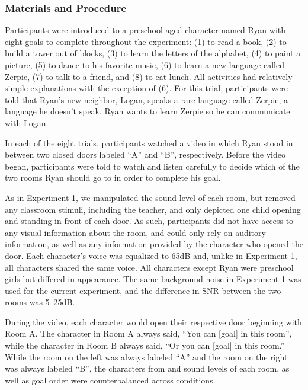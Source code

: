 \documentclass[10pt, letterpaper]{article}
\begin{document}
\hypertarget{materials-and-procedure-2}{%
\subsubsection{Materials and
Procedure}\label{materials-and-procedure-2}}

Participants were introduced to a preschool-aged character named Ryan
with eight goals to complete throughout the experiment: (1) to read a
book, (2) to build a tower out of blocks, (3) to learn the letters of
the alphabet, (4) to paint a picture, (5) to dance to his favorite
music, (6) to learn a new language called Zerpie, (7) to talk to a
friend, and (8) to eat lunch. All activities had relatively simple
explanations with the exception of (6). For this trial, participants
were told that Ryan's new neighbor, Logan, speaks a rare language called
Zerpie, a language he doesn't speak. Ryan wants to learn Zerpie so he
can communicate with Logan.

In each of the eight trials, participants watched a video in which Ryan
stood in between two closed doors labeled ``A'' and ``B'', respectively.
Before the video began, participants were told to watch and listen
carefully to decide which of the two rooms Ryan should go to in order to
complete his goal.

As in Experiment 1, we manipulated the sound level of each room, but
removed any classroom stimuli, including the teacher, and only depicted
one child opening and standing in front of each door. As such,
participants did not have access to any visual information about the
room, and could only rely on auditory information, as well as any
information provided by the character who opened the door. Each
character's voice was equalized to 65dB and, unlike in Experiment 1, all
characters shared the same voice. All characters except Ryan were
preschool girls but differed in appearance. The same background noise in
Experiment 1 was used for the current experiment, and the difference in
SNR between the two rooms was 5--25dB.

During the video, each character would open their respective door
beginning with Room A. The character in Room A always said, ``You can
{[}goal{]} in this room'', while the character in Room B always said,
``Or you can {[}goal{]} in this room.'' While the room on the left was
always labeled ``A'' and the room on the right was always labeled ``B'',
the characters from and sound levels of each room, as well as goal order
were counterbalanced across conditions.
\end{document}
